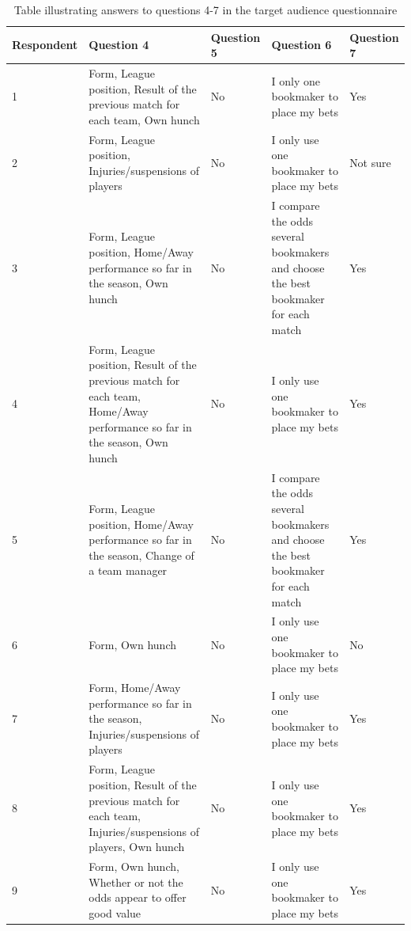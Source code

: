 \noindent
\begin{table}
\begin{tabular}{
  |p{}%
  |p{}|%
  |p{}%
  |p{}|%
  |p{}%
  }
  \hline
  \centering Respondent  & \centering Question 4  & \centering Question 5 &  \centering Question 6 & \centering\arraybackslash Question 7   \\ \hline
  1  & Form, League position, Result of the previous match for each team, Own hunch & No & I only one bookmaker to place my bets & Yes \\ \hline
  2 & Form, League position, Injuries/suspensions of players & No & I only use one bookmaker to place my bets & Not sure \\ \hline
  3 & Form, League position, Home/Away performance so far in the season, Own hunch & No & I compare the odds several bookmakers and choose the best bookmaker for each match & Yes \\ \hline
  4  & Form, League position, Result of the previous match for each team, Home/Away performance so far in the season, Own hunch & No & I only use one bookmaker to place my bets & Yes \\ \hline
   5 & Form, League position, Home/Away performance so far in the season, Change of a team manager & No & I compare the odds several bookmakers and choose the best bookmaker for each match & Yes \\ \hline
   6 & Form, Own hunch & No & I only use one bookmaker to place my bets & No \\ \hline
   7 & Form, Home/Away performance so far in the season, Injuries/suspensions of players & No & I only use one bookmaker to place my bets & Yes \\ \hline 
   8 & Form, League position, Result of the previous match for each team, Injuries/suspensions of players, Own hunch & No & I only use one bookmaker to place my bets & Yes \\ \hline
   9 & Form, Own hunch, Whether or not the odds appear to offer good value & No & I only use one bookmaker to place my bets & Yes \\ \hline
  \end{tabular}
 \caption{Table illustrating answers to questions 4-7 in the target audience questionnaire}

\end{table}

